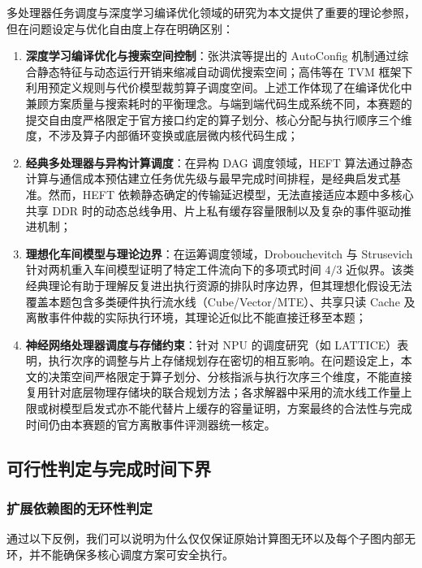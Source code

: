 \documentclass[anonymous,withtoc]{gmcm2026}
\providecommand{\tightlist}{\setlength{\itemsep}{0pt}\setlength{\parskip}{0pt}}
\begin{document}
多处理器任务调度与深度学习编译优化领域的研究为本文提供了重要的理论参照，但在问题设定与优化自由度上存在明确区别：

\begin{enumerate}
\def\labelenumi{\arabic{enumi}.}
\tightlist
\item
  \textbf{深度学习编译优化与搜索空间控制}：张洪滨等提出的 AutoConfig 机制\cite{ref13}通过综合静态特征与动态运行开销来缩减自动调优搜索空间；高伟等在 TVM 框架下\cite{ref14}利用预定义规则与代价模型裁剪算子调度空间。上述工作体现了在编译优化中兼顾方案质量与搜索耗时的平衡理念。与端到端代码生成系统不同，本赛题的提交自由度严格限定于官方接口约定的算子划分、核心分配与执行顺序三个维度，不涉及算子内部循环变换或底层微内核代码生成；
\item
  \textbf{经典多处理器与异构计算调度}：在异构 DAG 调度领域，HEFT 算法\cite{ref15}通过静态计算与通信成本预估建立任务优先级与最早完成时间排程，是经典启发式基准。然而，HEFT 依赖静态确定的传输延迟模型，无法直接适应本题中多核心共享 DDR 时的动态总线争用、片上私有缓存容量限制以及复杂的事件驱动推进机制；
\item
  \textbf{理想化车间模型与理论边界}：在运筹调度领域，Drobouchevitch 与 Strusevich 针对两机重入车间模型\cite{ref16}证明了特定工件流向下的多项式时间 \(4/3\) 近似界。该类经典理论有助于理解反复进出执行资源的排队时序边界，但其理想化假设无法覆盖本题包含多类硬件执行流水线（Cube/Vector/MTE）、共享只读 Cache 及离散事件仲裁的实际执行环境，其理论近似比不能直接迁移至本题；
\item
  \textbf{神经网络处理器调度与存储约束}：针对 NPU 的调度研究（如 LATTICE\cite{ref17}）表明，执行次序的调整与片上存储规划存在密切的相互影响。在问题设定上，本文的决策空间严格限定于算子划分、分核指派与执行次序三个维度，不能直接复用针对底层物理存储块的联合规划方法；各求解器中采用的流水线工作量上限或树模型启发式亦不能代替片上缓存的容量证明，方案最终的合法性与完成时间仍由本赛题的官方离散事件评测器统一核定。
\end{enumerate}

\subsection{可行性判定与完成时间下界}

\subsubsection{扩展依赖图的无环性判定}

通过以下反例，我们可以说明为什么仅仅保证原始计算图无环以及每个子图内部无环，并不能确保多核心调度方案可安全执行。
\end{document}

